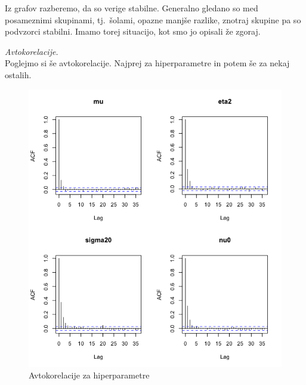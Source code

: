 \documentclass[a4paper,11pt]{article}
\begin{document}
\noindent
Iz grafov razberemo, da so verige stabilne. Generalno gledano so med posameznimi skupinami, tj.~šolami, opazne manjše razlike, znotraj skupine pa so podvzorci stabilni.
Imamo torej situacijo, kot smo jo opisali že zgoraj.

\newpage
\noindent
\textit{Avtokorelacije.}
\\
Poglejmo si še avtokorelacije. Najprej za hiperparametre in potem še za nekaj ostalih.
\begin{figure}[ht!]
    \centering
    \includegraphics[width = 160mm]{Slike/avto_hiper.png}
    \caption{Avtokorelacije za hiperparametre}
\end{figure}
\newpage
\end{document}
